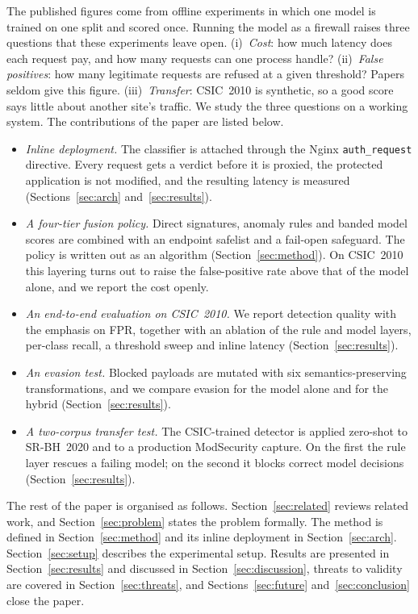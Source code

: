 \documentclass[preprint,11pt]{elsarticle}
\begin{document}
The published figures come from offline experiments in which one model is
trained on one split and scored once. Running the model as a firewall
raises three questions that these experiments leave open. (i)~\emph{Cost}:
how much latency does each request pay, and how many requests can one
process handle? (ii)~\emph{False positives}: how many legitimate requests
are refused at a given threshold? Papers seldom give this figure.
(iii)~\emph{Transfer}: CSIC~2010 is synthetic, so a good score says little
about another site's traffic. We study the three questions on a working
system. The contributions of the paper are listed below.
\begin{itemize}
\item \emph{Inline deployment.} The classifier is attached through the
Nginx \texttt{auth\_request} directive. Every request gets a verdict before
it is proxied, the protected application is not modified, and the
resulting latency is measured (Sections~\ref{sec:arch}
and~\ref{sec:results}).
\item \emph{A four-tier fusion policy.} Direct signatures, anomaly rules and
banded model scores are combined with an endpoint safelist and a fail-open
safeguard. The policy is written out as an algorithm
(Section~\ref{sec:method}). On CSIC~2010 this layering turns out to raise
the false-positive rate above that of the model alone, and we report the
cost openly.
\item \emph{An end-to-end evaluation on CSIC~2010.} We report detection
quality with the emphasis on FPR, together with an ablation of the rule and
model layers, per-class recall, a threshold sweep and inline latency
(Section~\ref{sec:results}).
\item \emph{An evasion test.} Blocked payloads are mutated with six
semantics-preserving transformations, and we compare evasion for the model
alone and for the hybrid (Section~\ref{sec:results}).
\item \emph{A two-corpus transfer test.} The CSIC-trained detector is
applied zero-shot to SR-BH~2020 and to a production ModSecurity capture. On
the first the rule layer rescues a failing model; on the second it blocks
correct model decisions (Section~\ref{sec:results}).
\end{itemize}

The rest of the paper is organised as follows.
Section~\ref{sec:related} reviews related work, and
Section~\ref{sec:problem} states the problem formally. The method is
defined in Section~\ref{sec:method} and its inline deployment in
Section~\ref{sec:arch}. Section~\ref{sec:setup} describes the experimental
setup. Results are presented in Section~\ref{sec:results} and discussed in
Section~\ref{sec:discussion}, threats to validity are covered in
Section~\ref{sec:threats}, and Sections~\ref{sec:future}
and~\ref{sec:conclusion} close the paper.
\end{document}
